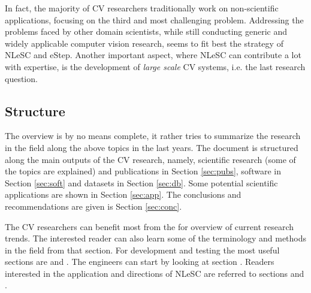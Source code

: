 In fact, the majority of CV researchers traditionally work on non-scientific applications, focusing on the third and most challenging problem. Addressing the problems faced by other domain scientists, while still conducting generic and widely applicable computer vision research, seems to fit best the strategy of NLeSC and eStep. Another important aspect, where NLeSC can contribute a lot with expertise, is the development of {\em large scale} CV systems, i.e. the last research question.

\subsection{Structure}
The overview is by no means complete, it rather tries to summarize the research in the field along the above topics in the last years. The document is structured along the main outputs of the CV research, namely, scientific research (some of the topics are explained) and publications in Section \ref{sec:pubs}, software in Section \ref{sec:soft} and datasets in Section \ref{sec:db}. Some potential scientific applications are shown in Section \ref{sec:app}. The conclusions and recommendations are given is Section \ref{sec:conc}.

The CV researchers can benefit most from the \underline{} for overview of current research trends. The interested reader can also learn some of the terminology and methods in the field from that section.  For development and testing the most useful sections are \underline{} and \underline{}.
The engineers can start by looking at section \underline{}.
Readers interested in the application and directions of NLeSC are referred to sections \underline{} and \underline{}.
